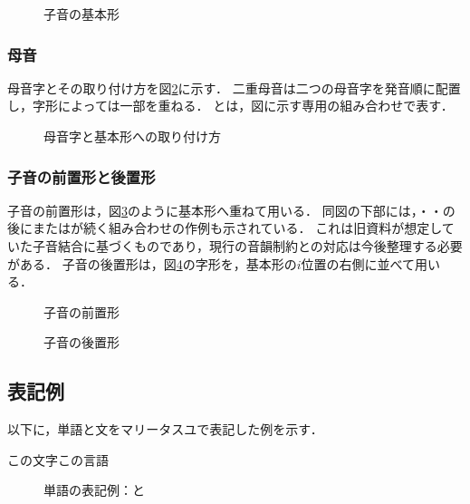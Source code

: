 \documentclass[../../main-detail.tex]{subfiles}
\begin{document}
\begin{figure}[H]
  \centering
  \caption{子音の基本形}
  \label{fig:maliitasuy-base}
\end{figure}

\subsubsection{母音}

母音字とその取り付け方を図\ref{fig:maliitasuy-vowels}に示す．
二重母音は二つの母音字を発音順に配置し，字形によっては一部を重ねる．
とは，図に示す専用の組み合わせで表す．

\begin{figure}[H]
  \centering
  \caption{母音字と基本形への取り付け方}
  \label{fig:maliitasuy-vowels}
\end{figure}

\subsubsection{子音の前置形と後置形}

子音の前置形は，図\ref{fig:maliitasuy-prefix}のように基本形へ重ねて用いる．
同図の下部には，・・の後にまたはが続く組み合わせの作例も示されている．
これは旧資料が想定していた子音結合に基づくものであり，現行の音韻制約との対応は今後整理する必要がある．
子音の後置形は，図\ref{fig:maliitasuy-postfix}の字形を，基本形の$i$位置の右側に並べて用いる．

\begin{figure}[H]
  \centering
  \caption{子音の前置形}
  \label{fig:maliitasuy-prefix}
\end{figure}

\begin{figure}[H]
  \centering
  \caption{子音の後置形}
  \label{fig:maliitasuy-postfix}
\end{figure}

\subsection{表記例}

以下に，単語と文をマリータスユで表記した例を示す．

\begin{exe}
  \ex {}\hspace{1cm}
  \glt この文字\hspace{1cm}この言語
\end{exe}
\begin{figure}[H]
  \centering
  \hfill
  \caption{単語の表記例：と}
  \label{fig:maliitasuy-example-words}
\end{figure}
\end{document}
